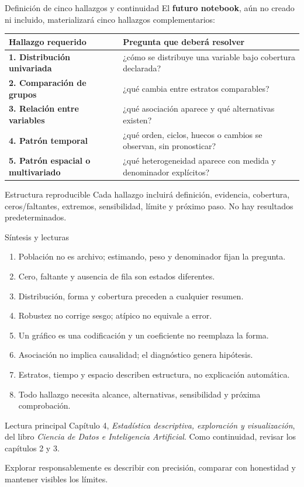 \documentclass[aspectratio=169,11pt]{beamer}
\begin{document}
\begin{frame}{Definición de cinco hallazgos y continuidad}
  \footnotesize
  El \textbf{futuro notebook}, aún no creado ni incluido, materializará cinco hallazgos complementarios:
  \begin{tabularx}{\textwidth}{>{\bfseries}p{} X}
    \toprule
    Hallazgo requerido & Pregunta que deberá resolver \\
    \midrule
    1. Distribución univariada & ¿cómo se distribuye una variable bajo cobertura declarada? \\
    2. Comparación de grupos & ¿qué cambia entre estratos comparables? \\
    3. Relación entre variables & ¿qué asociación aparece y qué alternativas existen? \\
    4. Patrón temporal & ¿qué orden, ciclos, huecos o cambios se observan, sin pronosticar? \\
    5. Patrón espacial o multivariado & ¿qué heterogeneidad aparece con medida y denominador explícitos? \\
    \bottomrule
  \end{tabularx}
  \vspace{.5em}
  \begin{block}{Estructura reproducible}
    Cada hallazgo incluirá definición, evidencia, cobertura, ceros/faltantes, extremos, sensibilidad, límite y próximo paso. No hay resultados predeterminados.
  \end{block}
\end{frame}

\begin{frame}{Síntesis y lecturas}
  \footnotesize
  \begin{enumerate}
    \item Población no es archivo; estimando, peso y denominador fijan la pregunta.
    \item Cero, faltante y ausencia de fila son estados diferentes.
    \item Distribución, forma y cobertura preceden a cualquier resumen.
    \item Robustez no corrige sesgo; atípico no equivale a error.
    \item Un gráfico es una codificación y un coeficiente no reemplaza la forma.
    \item Asociación no implica causalidad; el diagnóstico genera hipótesis.
    \item Estratos, tiempo y espacio describen estructura, no explicación automática.
    \item Todo hallazgo necesita alcance, alternativas, sensibilidad y próxima comprobación.
  \end{enumerate}
  \begin{block}{Lectura principal}
    Capítulo 4, \textit{Estadística descriptiva, exploración y visualización}, del libro \textit{Ciencia de Datos e Inteligencia Artificial}. Como continuidad, revisar los capítulos 2 y 3.
  \end{block}
  \centering\alert{Explorar responsablemente es describir con precisión, comparar con honestidad y mantener visibles los límites.}
\end{frame}
\end{document}
